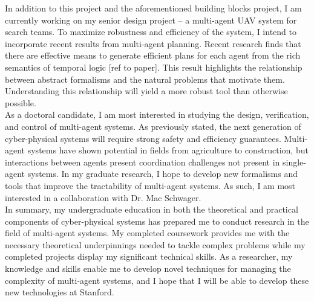 \documentclass[]{article}
\begin{document}
In addition to this project and the aforementioned building blocks project, I am currently working on my senior design project -- a multi-agent UAV system for search teams. To maximize robustness and efficiency of the system, I intend to incorporate recent results from multi-agent planning. Recent research finds that there are effective means to generate efficient plans for each agent from the rich semantics of temporal logic [ref to paper]. This result highlights the relationship between abstract formalisms and the natural problems that motivate them. Understanding this relationship will yield a more robust tool than otherwise possible.\\

As a doctoral candidate, I am most interested in studying the design, verification, and control of multi-agent systems. As previously stated, the next generation of cyber-physical systems will require strong safety and efficiency guarantees. Multi-agent systems have shown potential in fields from agriculture to construction, but interactions between agents present coordination challenges not present in single-agent systems. In my graduate research, I hope to develop new formalisms and tools that improve the tractability of multi-agent systems. As such, I am most interested in a collaboration with Dr. Mac Schwager.\\

In summary, my undergraduate education in both the theoretical and practical components of cyber-physical systems has prepared me to conduct research in the field of multi-agent systems. My completed coursework provides me with the necessary theoretical underpinnings needed to tackle complex problems while my completed projects display my significant technical skills. As a researcher, my knowledge and skills enable me to develop novel techniques for managing the complexity of multi-agent systems, and I hope that I will be able to develop these new technologies at Stanford.

\pagebreak
\end{document}
